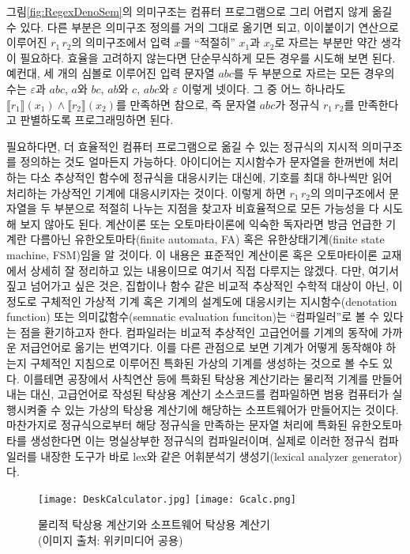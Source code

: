 그림\;\ref{fig:RegexDenoSem}의 의미구조는 컴퓨터 프로그램으로 그리
어렵지 않게 옮길 수 있다. 다른 부분은 의미구조 정의를 거의 그대로
옮기면 되고, 이이붙이기 연산으로 이루어진 $r_1\,r_2$의 의미구조에서
입력 $x$를 ``적절히'' $x_1$과 $x_2$로 자르는 부분만 약간 생각이 필요하다.
효율을 고려하지 않는다면 단순무식하게 모든 경우를 시도해 보면 된다.
예컨대, 세 개의 심볼로 이루어진 입력 문자열 $abc$를 두 부분으로 자르는
모든 경우의 수는 $\varepsilon$과 $abc$, $a$와 $bc$, $ab$와 $c$, $abc$와
$\varepsilon$ 이렇게 넷이다. 그 중 어느 하나라도
$\llbracket r_1\rrbracket(x_1) \land \llbracket r_2\rrbracket(x_2)$를
만족하면 참으로, 즉 문자열 $abc$가 정규식 $r_1\,r_2$를 만족한다고
판별하도록 프로그래밍하면 된다.

필요하다면, 더 효율적인 컴퓨터 프로그램으로 옮길 수 있는 정규식의
지시적 의미구조를 정의하는 것도 얼마든지 가능하다. 아이디어는
지시함수가 문자열을 한꺼번에 처리하는 다소 추상적인 함수에 정규식을
대응시키는 대신에, 기호를 최대 하나씩만 읽어 처리하는 가상적인 기계에
대응시키자는 것이다. 이렇게 하면 $r_1\,r_2$의 의미구조에서 문자열을
두 부분으로 적절히 나누는 지점을 찾고자 비효율적으로 모든 가능성을
다 시도해 보지 않아도 된다. 계산이론 또는 오토마타이론에 익숙한 독자라면
방금 언급한 기계란 다름아닌 유한오토마타(finite automata, FA) 혹은
유한상태기계(finite state machine, FSM)임을 알 것이다. 이 내용은
표준적인 계산이론 혹은 오토마타이론 교재\cite{Sipser2013,Hopcroft2007}에서
상세히 잘 정리하고 있는 내용이므로 여기서 직접 다루지는 않겠다.
다만, 여기서 짚고 넘어가고 싶은 것은, 집합이나 함수 같은 비교적
추상적인 수학적 대상이 아닌, 이정도로 구체적인 가상적 기계 혹은
기계의 설계도에 대응시키는 지시함수(denotation function) 또는
의미값함수(semnatic evaluation funciton)는 ``컴파일러''로
볼 수 있다는 점을 환기하고자 한다. 컴파일러는 비교적 추상적인
고급언어를 기계의 동작에 가까운 저급언어로 옮기는 번역기다.
이를 다른 관점으로 보면 기계가 어떻게 동작해야 하는지 구체적인
지침으로 이루어진 특화된 가상의 기계를 생성하는 것으로 볼 수도 있다.
이를테면 공장에서 사칙연산 등에 특화된 탁상용 계산기라는 물리적 기계를
만들어내는 대신, 고급언어로 작성된 탁상용 계산기 소스코드를 컴파일하면
범용 컴퓨터가 실행시켜줄 수 있는 가상의 탁상용 계산기에 해당하는
소프트웨어가 만들어지는 것이다. 마찬가지로 정규식으로부터 해당 정규식을
만족하는 문자열 처리에 특화된 유한오토마타를 생성한다면
이는 명실상부한 정규식의 컴파일러이며, 실제로 이러한 정규식 컴파일러를
내장한 도구가 바로 lex\cite{lex1990}와 같은
어휘분석기 생성기(lexical analyzer generator)다.

\begin{figure}\centering
\texttt{[image: DeskCalculator.jpg]}\qquad
\texttt{[image: Gcalc.png]}\qquad\qquad
\caption{물리적 탁상용 계산기와 소프트웨어 탁상용 계산기\\
         {\scriptsize(이미지 출처: 위키미디어 공용)}}
\end{figure}


